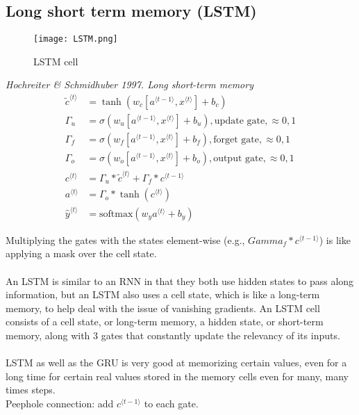 \subsection{Long short term memory (LSTM)}
\begin{figure}[h]
    \centering
    \texttt{[image: LSTM.png]}
    \caption{LSTM cell}
    \label{fig:LSTM}
\end{figure}
\textit{Hochreiter \& Schmidhuber 1997. Long short-term memory}
\begin{align}
\tilde{c}^{\langle t \rangle} &= \tanh(w_c[a^{\langle t-1 \rangle}, x^{\langle t \rangle} ] + b_c)\\
\Gamma_u &= \sigma (w_u[a^{\langle t-1 \rangle}, x^{\langle t \rangle}] + b_u), \text{update gate}, \approx {0,1}\\
\Gamma_f  &= \sigma (w_f[a^{\langle t-1 \rangle}, x^{\langle t \rangle}] + b_f), \text{forget gate}, \approx {0,1}\\
\Gamma_o &= \sigma (w_o[a^{\langle t-1 \rangle}, x^{\langle t \rangle}] + b_o), \text{output gate}, \approx {0,1}\\
c^{\langle t \rangle} &= \Gamma_u * \tilde{c}^{\langle t \rangle} + \Gamma_f * c^{\langle t-1 \rangle}\\
a^{\langle t \rangle} &= \Gamma_o * \tanh(c^{\langle t \rangle}) \\
\hat{y}^{\langle t \rangle} &= \text{softmax}(w_{y}a^{\langle t \rangle} + b_y)
\end{align}

Multiplying the gates with the states element-wise (e.g., $Gamma_f* c^{\langle t-1 \rangle}$) is like applying a mask over the cell state.\\
\\
An LSTM is similar to an RNN in that they both use hidden states to pass along information, but an LSTM also uses a cell state, which is like a long-term memory, to help deal with the issue of vanishing gradients. An LSTM cell consists of a cell state, or long-term memory, a hidden state, or short-term memory, along with 3 gates that constantly update the relevancy of its inputs.\\
\\
LSTM as well as the GRU is very good at memorizing certain values, even for a long time for certain real values stored in the memory cells even for many, many times steps.\\
Peephole connection: add $c^{\langle t-1 \rangle}$ to each gate.

